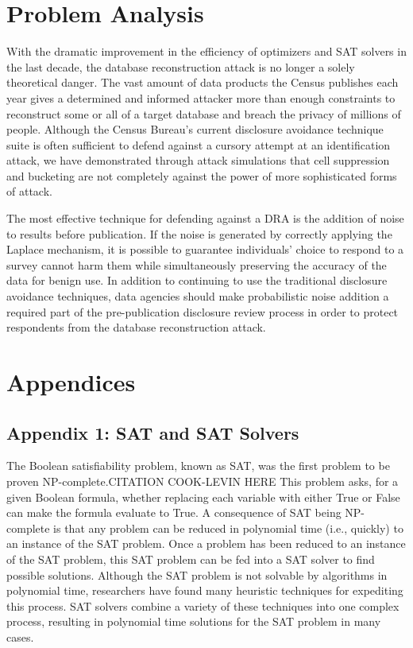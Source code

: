 \documentclass[jou,apacite]{apa6}
\begin{document}
\section{Problem Analysis}

With the dramatic improvement in the efficiency of optimizers and SAT solvers in the last decade, the database reconstruction attack is no longer a solely theoretical danger. The vast amount of data products the Census publishes each year gives a determined and informed attacker more than enough constraints to reconstruct some or all of a target database and breach the privacy of millions of people. Although the Census Bureau's current disclosure avoidance technique suite is often sufficient to defend against a cursory attempt at an identification attack, we have demonstrated through attack simulations that cell suppression and bucketing are not completely against the power of more sophisticated forms of attack.

The most effective technique for defending against a DRA is the addition of noise to results before publication. If the noise is generated by correctly applying the Laplace mechanism, it is possible to guarantee individuals' choice to respond to a survey cannot harm them while simultaneously preserving the accuracy of the data for benign use. In addition to continuing to use the traditional disclosure avoidance techniques, data agencies should make probabilistic noise addition a required part of the pre-publication disclosure review process in order to protect respondents from the database reconstruction attack.

\section{Appendices}

\subsection{Appendix 1: SAT and SAT Solvers}

The Boolean satisfiability problem, known as SAT, was the first problem to be proven NP-complete.CITATION COOK-LEVIN HERE This problem asks, for a given Boolean formula, whether replacing each variable with either True or False can make the formula evaluate to True.   A consequence of SAT being NP-complete is that any problem can be reduced in polynomial time (i.e., quickly) to an instance of the SAT problem. Once a problem has been reduced to an instance of the SAT problem, this SAT problem can be fed into a SAT solver to find possible solutions. Although the SAT problem is not solvable by algorithms in polynomial time, researchers have found many heuristic techniques for expediting this process. SAT solvers combine a variety of these techniques into one complex process, resulting in polynomial time solutions for the SAT problem in many cases.
\end{document}

